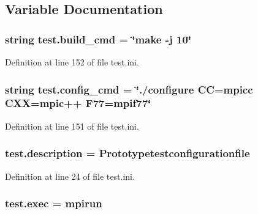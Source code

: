 \subsection{Variable Documentation}
\hypertarget{namespacetest_aaa8f1db02a6b0b450565529cebd91d5c}{
\subsubsection[{build\-\_\-cmd}]{\setlength{\rightskip}{0pt plus 5cm}string test.\-build\-\_\-cmd = \char`\"{}make -\/j 10\char`\"{}}}\label{namespacetest_aaa8f1db02a6b0b450565529cebd91d5c}


Definition at line 152 of file test.\-ini.

\hypertarget{namespacetest_a94ef7b9eb439fa68dbcb5ffd2b3247d2}{
\subsubsection[{config\-\_\-cmd}]{\setlength{\rightskip}{0pt plus 5cm}string test.\-config\-\_\-cmd = \char`\"{}./configure C\-C=mpicc C\-X\-X=mpic++ F77=mpif77\char`\"{}}}\label{namespacetest_a94ef7b9eb439fa68dbcb5ffd2b3247d2}


Definition at line 151 of file test.\-ini.

\hypertarget{namespacetest_a1c2a3a63faa9854257983fbb3de9e11d}{
\subsubsection[{description}]{\setlength{\rightskip}{0pt plus 5cm}test.\-description = Prototypetestconfigurationfile}}\label{namespacetest_a1c2a3a63faa9854257983fbb3de9e11d}


Definition at line 24 of file test.\-ini.

\hypertarget{namespacetest_a306f9d9d5c20138c75077ea9bb2b2df4}{
\subsubsection[{exec}]{\setlength{\rightskip}{0pt plus 5cm}test.\-exec = mpirun}}\label{namespacetest_a306f9d9d5c20138c75077ea9bb2b2df4}


